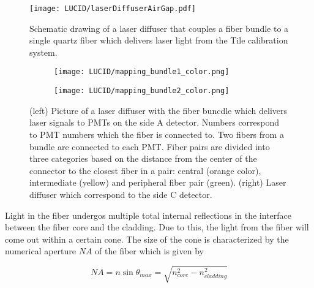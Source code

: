 \begin{figure}
\centering
\texttt{[image: LUCID/laserDiffuserAirGap.pdf]}
\caption{Schematic drawing of a laser diffuser that couples a fiber bundle to a single quartz fiber which delivers laser light from the Tile calibration system.}
\label{fig:laserDiffuserSchematics}
\end{figure}

\begin{figure}
\centering
\begin{subfigure}{.45\textwidth}
  \centering
  \texttt{[image: LUCID/mapping\_bundle1\_color.png]}
\end{subfigure}%
\begin{subfigure}{.45\textwidth}
  \centering
  \texttt{[image: LUCID/mapping\_bundle2\_color.png]}
\end{subfigure}
\caption{(left) Picture of a laser diffuser with the fiber buncdle which delivers laser signals to PMTs on the side A detector. 
Numbers correspond to PMT numbers which the fiber is connected to. 
Two fibers from a bundle are connected to each PMT. 
Fiber pairs are divided into three categories based on the distance from the center of the connector to the closest fiber 
in a pair: central (orange color), intermediate (yellow) and peripheral fiber pair (green).
(right) Laser diffuser which correspond to the side C detector.}
\label{fig:laserDiffuserMapping}
\end{figure}

Light in the fiber undergos multiple total internal reflections in the interface between the fiber core and the cladding. 
Due to this, the light from the fiber will come out within a certain cone. 
The size of the cone is characterized by the numerical aperture $NA$ of the fiber which is given by

\begin{equation}
\label{eq:numericalApperture}
 NA = n \sin{\theta_{max}} = \sqrt{n_{core}^2 - n_{cladding}^2}
\end{equation}

